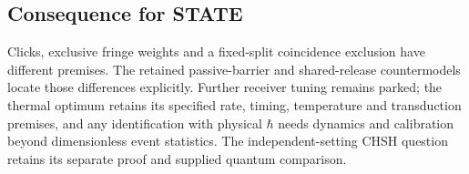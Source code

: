 \documentclass[11pt,a4paper]{article}
\begin{document}
\hypertarget{consequence-for-state}{%
\subsection{Consequence for STATE}\label{consequence-for-state}}

Clicks, exclusive fringe weights and a fixed-split coincidence exclusion
have different premises. The retained passive-barrier and shared-release
countermodels locate those differences explicitly. Further receiver
tuning remains parked; the thermal optimum retains its specified rate,
timing, temperature and transduction premises, and any identification
with physical \(\hbar\) needs dynamics and calibration beyond
dimensionless event statistics. The independent-setting CHSH question
retains its separate proof and supplied quantum comparison.
\end{document}
